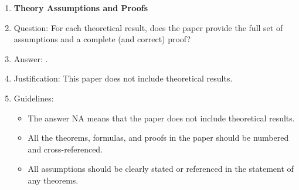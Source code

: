 \documentclass{article}
\begin{document}
\begin{enumerate}
\begin{itemize}
        \item The authors should reflect on the scope of the claims made, e.g., if the approach was only tested on a few datasets or with a few runs. In general, empirical results often depend on implicit assumptions, which should be articulated.
        \item The authors should reflect on the factors that influence the performance of the approach. For example, a facial recognition algorithm may perform poorly when image resolution is low or images are taken in low lighting. Or a speech-to-text system might not be used reliably to provide closed captions for online lectures because it fails to handle technical jargon.
        \item The authors should discuss the computational efficiency of the proposed algorithms and how they scale with dataset size.
        \item If applicable, the authors should discuss possible limitations of their approach to address problems of privacy and fairness.
        \item While the authors might fear that complete honesty about limitations might be used by reviewers as grounds for rejection, a worse outcome might be that reviewers discover limitations that aren't acknowledged in the paper. The authors should use their best judgment and recognize that individual actions in favor of transparency play an important role in developing norms that preserve the integrity of the community. Reviewers will be specifically instructed to not penalize honesty concerning limitations.
    \end{itemize}
\item {\bf Theory Assumptions and Proofs}
    \item[] Question: For each theoretical result, does the paper provide the full set of assumptions and a complete (and correct) proof?
    \item[] Answer: \answerNA{}.
    \item[] Justification: This paper does not include theoretical results.
    \item[] Guidelines:
    \begin{itemize}
        \item The answer NA means that the paper does not include theoretical results.
        \item All the theorems, formulas, and proofs in the paper should be numbered and cross-referenced.
        \item All assumptions should be clearly stated or referenced in the statement of any theorems.

\end{itemize}
\end{enumerate}
\end{document}
